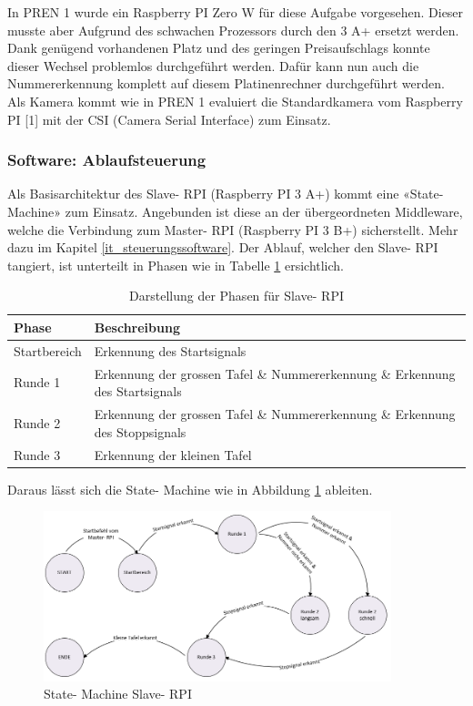 \documentclass[../../main.tex]{subfiles}
\begin{document}
In PREN 1 wurde ein Raspberry PI Zero W für diese Aufgabe vorgesehen. Dieser musste aber Aufgrund des schwachen Prozessors durch den 3 A+ ersetzt werden. Dank genügend vorhandenen Platz und des geringen Preisaufschlags konnte dieser Wechsel problemlos durchgeführt werden. Dafür kann nun auch die Nummererkennung komplett auf diesem Platinenrechner durchgeführt werden. Als Kamera kommt wie in PREN 1 evaluiert die Standardkamera vom Raspberry PI [1] mit der CSI (Camera Serial Interface) zum Einsatz.

\subsubsection{Software: Ablaufsteuerung}
Als Basisarchitektur des Slave- RPI (Raspberry PI 3 A+) kommt eine «State- Machine» zum Einsatz. Angebunden ist diese an der übergeordneten Middleware, welche die Verbindung zum Master- RPI (Raspberry PI 3 B+) sicherstellt. Mehr dazu im Kapitel \ref{it_steuerungssoftware}. Der Ablauf, welcher den Slave- RPI tangiert, ist unterteilt in Phasen wie in Tabelle \ref{tab:Phasentabelle} ersichtlich.

\begin{table}[H] %
  \begin{flushleft}
      \begin{tabular}{ | p{3cm} | p{10.5cm} |}
          \hline
          \textbf{Phase}  & \textbf{Beschreibung} \\\hline
          Startbereich & Erkennung des Startsignals \\\hline
          Runde 1      & Erkennung der grossen Tafel \& Nummererkennung \&  Erkennung des Startsignals \\\hline
          Runde 2      & Erkennung der grossen Tafel \& Nummererkennung \& Erkennung des Stoppsignals \\\hline
          Runde 3      & Erkennung der kleinen Tafel \\\hline
      \end{tabular}
  \end{flushleft}
  \caption{Darstellung der Phasen für Slave- RPI}
  \label{tab:Phasentabelle}
\end{table}

Daraus lässt sich die State- Machine wie in Abbildung \ref{fig:state-machine} ableiten.
\vspace{1cm}

\begin{figure}[H] %
  \centering
  \includegraphics[width=0.9\textwidth]{state-machine.png}
  \caption{State- Machine Slave- RPI}
  \label{fig:state-machine}
\end{figure}
\end{document}
